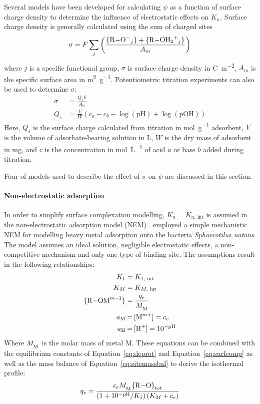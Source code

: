 Several models have been developed for calculating $ \psi $ as a function of surface charge density to determine the influence of electrostatic effects on $ K_n $. Surface charge density is generally calculated using the sum of charged sites
\begin{equation}
\sigma = F\sum_j \left(\frac{\ce{\{R-O^-$_j$\} + \{R-OH2^+$_j$\}}}{A_{m}}\right)
\end{equation}
where $ j $ is a specific functional group, $ \sigma $ is surface charge density in \si{\coulomb\per\meter\squared},  $ A_{m} $ is the specific surface area in \si{\meter\squared\per\gram}. Potentiometric titration experiments can also be used to determine $ \sigma $:
\begin{align}
\sigma &= \frac{Q_sF}{A_m}\\
Q_s &= \frac{V}{W} \left( c_a - c_b - \log\left(\textrm{pH}\right) + \log\left(\textrm{pOH}\right) \right)
\end{align} 
Here, $ Q_s $ is the surface charge calculated from titration in \si{\mole\per\gram} adsorbent, $ V $ is the volume of adsorbate-bearing solution in \si{\liter}, $ W $ is the dry mass of adsorbent in \si{\milli\gram}, and $ c $ is the concentration in \si{\mol\per\liter} of acid $ a $ or base $ b $ added during titration.

Four of models used to describe the effect of $ \sigma $ on $ \psi $ are discussed in this section.



\paragraph{Non-electrostatic adsorption} In order to simplify surface complexation modelling, $ K_n = K_{n,\mathrm{~int}} $ is assumed in the non-electrostatic adsorption model (NEM) \parencite{Turner2005}. \textcite{Esposito2002} employed a simple mechanistic NEM for modelling heavy metal adsorption onto the bacteria \textit{Sphaerotilus natans}. The model assumes an ideal solution, negligible electrostatic effects, a non-competitive mechanism and only one type of binding site. The assumptions result in the following relationships:
\begin{align}
K_1 &= K_{1,\textrm{~int}} \\
K_M &= K_{M,\textrm{~int}} \\
\ce{\{R-OM^{$m-1$}\}} &= \frac{q_e}{M_\textsubscript{M}}   \\
\ce{$a$_M &= [M^{$m$+}]} = c_e \\
\ce{$a$_H &= [H^+]} = 10^{-\textrm{pH}} 
\end{align}
Where $ M_\textsubscript{M} $ is the molar mass of metal M. These equations can be combined with the equilibrium constants of Equation~\ref{eq:deprot} and Equation~\ref{eq:surfcomp} as well as the mass balance of Equation~\ref{eq:sitemassbal} to derive the isothermal profile:
\begin{equation}
q_e = \frac{c_e M_\textsubscript{M}\ce{\{R-O\}}_\textrm{tot}} {\left(1 + 10^{-\textrm{pH}}/K_1\right) \left(K_M + c_e\right)}
\end{equation}


